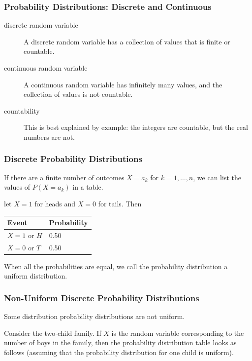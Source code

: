 \documentclass[xcolor=dvipsnames]{beamer}
\begin{document}
\begin{frame}
  \frametitle{Probability Distributions: Discrete and Continuous}
\begin{description}
\item[discrete random variable] A \alert{discrete} random variable has
  a collection of values that is finite or countable.
\item[continuous random variable] A \alert{continuous} random variable has
  infinitely many values, and the collection of values is not
  countable.
\item[countability] This is best explained by example: the integers
  are countable, but the real numbers are not.
\end{description}
\end{frame}

\begin{frame}
  \frametitle{Discrete Probability Distributions}
  If there are a finite number of outcomes $X=a_{k}$ for
  $k=1,\ldots,n$, we can list the values of $P(X=a_{k})$ in a table. 

\bigskip

\label{ex:ootiteij} let $X=1$ for heads and $X=0$
for tails. Then 

\bigskip

\begin{tabular}{|l|l|}\hline
  Event & Probability \\ \hline
  $X=1$ or $H$ & 0.50 \\ \hline
  $X=0$ or $T$ & 0.50 \\ \hline
\end{tabular}

\bigskip

When all the probabilities are equal, we call the probability
distribution a \alert{uniform distribution}.
\end{frame}

\begin{frame}
  \frametitle{Non-Uniform Discrete Probability Distributions}
  Some distribution probability distributions are not uniform.

\bigskip

  \label{ex:shaisail} Consider the
  two-child family. If $X$ is the random variable corresponding to the
  number of boys in the family, then the probability distribution
  table looks as follows (assuming that the probability distribution
  for one child is uniform).
\end{frame}
\end{document}
